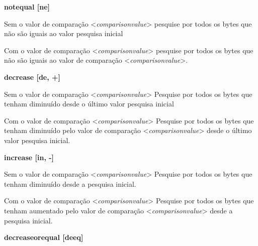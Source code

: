 \documentclass[letterpaper,10pt,brazil]{sphinxmanual}
\begin{document}
\begin{DUlineblock}{0em}
\begin{DUlineblock}{\DUlineblockindent}
\item[] \textbf{notequal {[}ne{]}}
\item[] 
\end{DUlineblock}
\item[] Sem o valor de comparação \textless{}\emph{comparisonvalue}\textgreater{} pesquise por todos os bytes que não são iguais ao valor pesquisa inicial
\item[] Com o valor de comparação \textless{}\emph{comparisonvalue}\textgreater{} pesquise por todos os bytes que não são iguais ao valor de comparação \textless{}\emph{comparisonvalue}\textgreater{}.
\item[] 
\item[]
\begin{DUlineblock}{\DUlineblockindent}
\item[] \textbf{decrease {[}de, +{]}}
\item[] 
\end{DUlineblock}
\item[] Sem o valor de comparação \textless{}\emph{comparisonvalue}\textgreater{} Pesquise por todos os bytes que tenham diminuído desde o último valor pesquisa inicial
\item[] Com o valor de comparação \textless{}\emph{comparisonvalue}\textgreater{} Pesquise por todos os bytes que tenham diminuído pelo valor de comparação \textless{}\emph{comparisonvalue}\textgreater{} desde o último valor pesquisa inicial.
\item[] 
\item[]
\begin{DUlineblock}{\DUlineblockindent}
\item[] \textbf{increase {[}in, -{]}}
\item[] 
\end{DUlineblock}
\item[] Sem o valor de comparação \textless{}\emph{comparisonvalue}\textgreater{} Pesquise por todos os bytes que tenham diminuído desde a pesquisa inicial.
\item[] 
\item[] Com o valor de comparação \textless{}\emph{comparisonvalue}\textgreater{} Pesquise por todos os bytes que tenham aumentado pelo valor de comparação \textless{}\emph{comparisonvalue}\textgreater{} desde a pesquisa inicial.
\item[] 
\item[]
\begin{DUlineblock}{\DUlineblockindent}
\item[] \textbf{decreaseorequal {[}deeq{]}}

\end{DUlineblock}
\end{DUlineblock}
\end{document}
